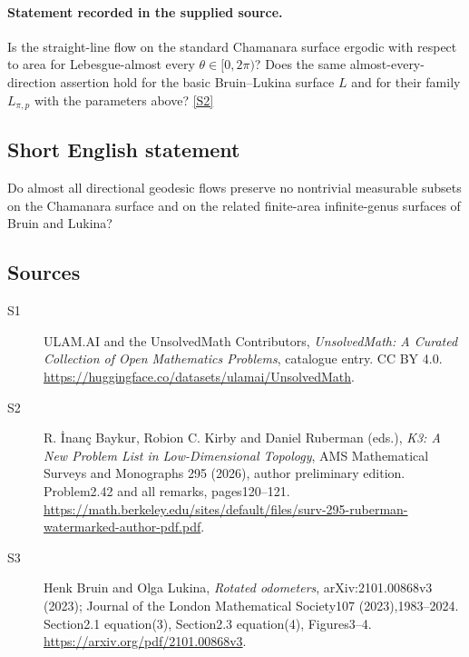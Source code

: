 \documentclass[11pt]{book}
\newcommand{\sref}[2]{\hyperlink{source:#1:#2}{[S#2]}}
\begin{document}
\paragraph{Statement recorded in the supplied source.}
Is the straight-line flow on the standard Chamanara surface ergodic with respect to area for Lebesgue-almost every $\theta\in[0,2\pi)$? Does the same almost-every-direction assertion hold for the basic Bruin--Lukina surface $L$ and for their family $L_{\pi,p}$ with the parameters above? \sref{statement}{2}
\subsection{Short English statement}
Do almost all directional geodesic flows preserve no nontrivial measurable subsets on the Chamanara surface and on the related finite-area infinite-genus surfaces of Bruin and Lukina?
\subsection{Sources}
\begin{description}
\item[\hypertarget{source:statement:1}{S1}] ULAM.AI and the UnsolvedMath Contributors, \emph{UnsolvedMath: A Curated Collection of Open Mathematics Problems}, catalogue entry. CC BY 4.0. \url{https://huggingface.co/datasets/ulamai/UnsolvedMath}.
\item[\hypertarget{source:statement:2}{S2}] R. İnanç Baykur, Robion C. Kirby and Daniel Ruberman (eds.), \emph{K3: A New Problem List in Low-Dimensional Topology}, AMS Mathematical Surveys and Monographs 295 (2026), author preliminary edition. Problem2.42 and all remarks, pages120--121. \url{https://math.berkeley.edu/sites/default/files/surv-295-ruberman-watermarked-author-pdf.pdf}.
\item[\hypertarget{source:statement:3}{S3}] Henk Bruin and Olga Lukina, \emph{Rotated odometers}, arXiv:2101.00868v3 (2023); Journal of the London Mathematical Society107 (2023),1983--2024. Section2.1 equation(3), Section2.3 equation(4), Figures3--4. \url{https://arxiv.org/pdf/2101.00868v3}.
\end{description}
\label{end:statement}
\end{document}
